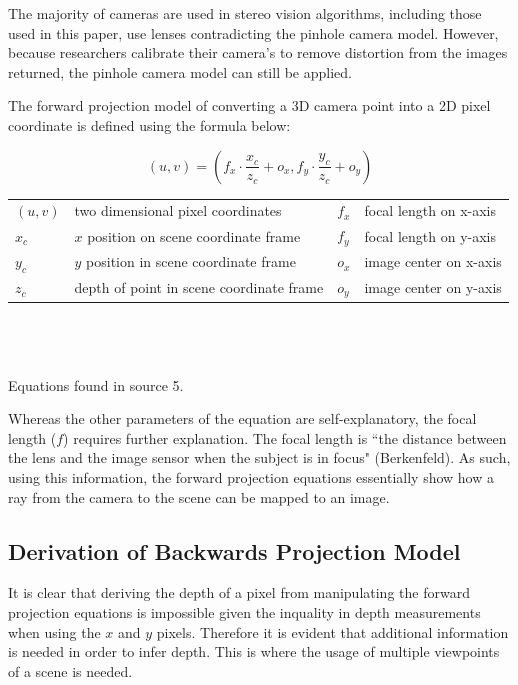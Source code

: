 \documentclass[11pt]{scrartcl}
\begin{document}
\begin{remark}
  The majority of cameras are used in stereo vision algorithms, including those
  used in this paper, use lenses contradicting the pinhole camera model.
  However, because researchers calibrate their camera's to remove
  distortion from the images returned, the pinhole camera model can still
  be applied.
\end{remark}
The forward projection model of converting a 3D camera point into a 2D pixel
coordinate is defined using the formula below:
\begin{theorem}

  \begin{displaymath}
    (u, v) = (f_x \cdot \displaystyle\frac{x_c}{z_c} + o_x,
    f_y \cdot \displaystyle\frac{y_c}{z_c} + o_y)
  \end{displaymath}
  \begin{figurekey}
    \begin{tabular}{llll}
      $(u,v)$ & two dimensional pixel coordinates        & $f_x$ & focal length on x-axis \\
      $x_c$   & $x$ position on scene coordinate frame   & $f_y$ & focal length on y-axis \\
      $y_c$   & $y$ position in scene coordinate frame   & $o_x$ & image center on x-axis \\
      $z_c$   & depth of point in scene coordinate frame & $o_y$ & image center on y-axis \\
    \end{tabular}
  \end{figurekey}
  \\ \\ \\
  Equations found in source 5.
\end{theorem}
Whereas the other parameters of the equation are self-explanatory, the focal
length ($f$) requires further explanation. The focal length is ``the distance
between the lens and the image sensor when the subject is in focus" (Berkenfeld).
As such, using this information, the forward projection equations essentially show how a ray from the camera to the scene can be mapped to an image.

\subsection{Derivation of Backwards Projection Model}
It is clear that deriving the depth of a pixel from manipulating the forward
projection equations is impossible given the inquality in depth measurements
when using the $x$ and $y$ pixels. Therefore it is evident that additional
information is needed in order to infer depth. This is where the usage of
multiple viewpoints of a scene is needed.
\end{document}
